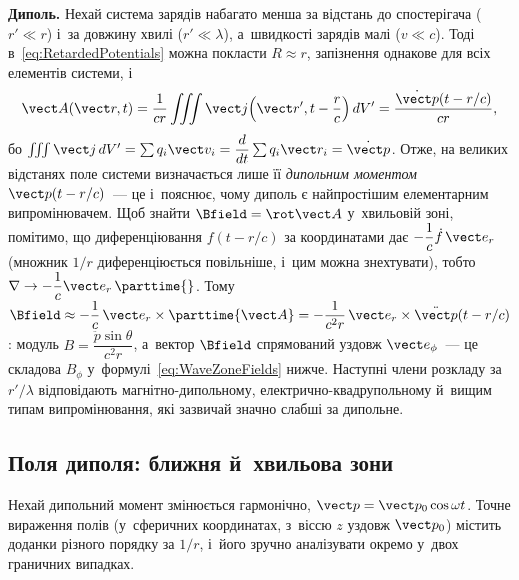 \textbf{Диполь.} Нехай система зарядів набагато менша за відстань до спостерігача ($r'\ll r$) і~за довжину
хвилі ($r'\ll\lambda$), а~швидкості зарядів малі ($v\ll c$). Тоді в~\eqref{eq:RetardedPotentials} можна покласти
$R\approx r$, запізнення однакове для всіх елементів системи, і
\begin{equation*}
	\vect A(\vect r,t)=\frac1{cr}\iiint\vect j\!\left(\vect r',t-\frac rc\right)dV'=\frac{\dot{\vect p}(t-r/c)}{cr},
\end{equation*}
бо $\iiint\vect j\,dV'=\sum q_i\vect v_i=\dfrac d{dt}\sum q_i\vect r_i=\dot{\vect p}$. Отже, на великих відстанях
поле системи визначається лише її \emph{дипольним моментом} $\vect p(t-r/c)$~--- це і~пояснює, чому
диполь є найпростішим елементарним випромінювачем. Щоб знайти $\Bfield=\rot\vect A$ у~хвильовій зоні, помітимо, що
диференціювання $f(t-r/c)$ за координатами дає $-\dfrac1c\dot f\,\vect e_r$ (множник $1/r$ диференціюється повільніше,
і~цим можна знехтувати), тобто $\nabla\to-\dfrac1c\vect e_r\,\parttime{}$. Тому
$\Bfield\approx-\dfrac1c\,\vect e_r\times\parttime{\vect A}=-\dfrac1{c^2r}\,\vect e_r\times\ddot{\vect p}(t-r/c)$:
модуль $B=\dfrac{\ddot p\sin\theta}{c^2r}$, а~вектор $\Bfield$ спрямований уздовж $\vect e_\phi$~--- це складова $B_\phi$
у~формулі~\eqref{eq:WaveZoneFields} нижче. Наступні члени розкладу за $r'/\lambda$ відповідають магнітно-дипольному,
електрично-квадрупольному й~вищим типам випромінювання, які зазвичай значно слабші за дипольне.



\subsection*{Поля диполя: ближня й~хвильова зони}



Нехай дипольний момент змінюється гармонічно, $\vect p = \vect p_0\cos\omega t$. Точне
вираження полів (у~сферичних координатах, з~віссю $z$ уздовж $\vect p_0$) містить доданки
різного порядку за $1/r$, і~його зручно аналізувати окремо у~двох граничних випадках.



